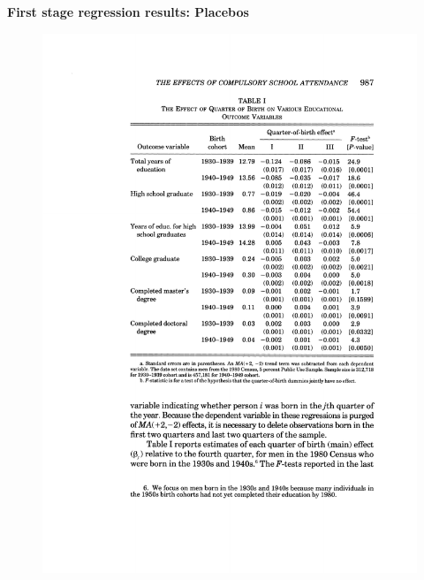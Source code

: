 \documentclass[notes=show]{beamer}
\begin{document}
\begin{frame}[plain]

	\begin{center}
	\textbf{First stage regression results: Placebos}
	\end{center}
	
	\begin{figure}
	\includegraphics{./lecture_includes/qob_5b.pdf}
	\end{figure}
\end{frame}
\end{document}
